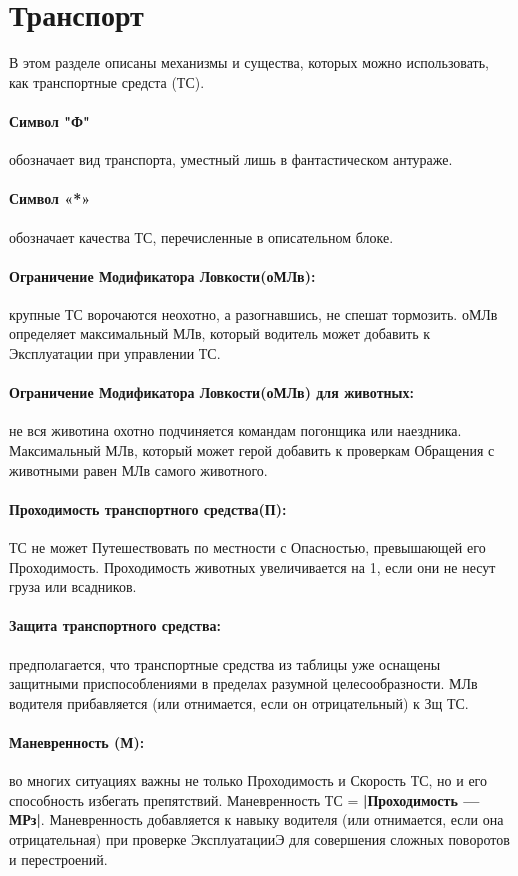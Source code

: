 \section{Транспорт}
В этом разделе описаны механизмы и существа, которых можно использовать, как транспортные средста (ТС).
\paragraph{Символ "Ф"} обозначает вид транспорта, уместный лишь в фантастическом антураже.
\paragraph{Символ «*»} обозначает качества ТС, перечисленные в описательном блоке.
\paragraph{Ограничение Модификатора Ловкости(оМЛв):} крупные ТС ворочаются неохотно, а разогнавшись, не спешат тормозить. оМЛв определяет максимальный МЛв, который водитель может добавить к Эксплуатации при управлении ТС.
\paragraph{Ограничение Модификатора Ловкости(оМЛв) для животных:} не вся животина охотно подчиняется командам погонщика или наездника. Максимальный МЛв, который может герой добавить к проверкам Обращения с животными равен МЛв самого животного.
\paragraph{Проходимость транспортного средства(П):} ТС не может Путешествовать по местности с Опасностью, превышающей его Проходимость. 
\newline Проходимость животных увеличивается на 1, если они не несут груза или всадников.

\paragraph{Защита транспортного средства:} предполагается, что транспортные средства из таблицы уже оснащены защитными приспособлениями в пределах разумной целесообразности. 
\newline МЛв водителя прибавляется (или отнимается, если он отрицательный) к Зщ ТС.
\paragraph{Маневренность (М):} во многих ситуациях важны не только Проходимость и Скорость ТС, но и его способность избегать препятствий. Маневренность ТС = \textbf{|Проходимость — МРз|}. Маневренность добавляется к навыку водителя (или отнимается, если она отрицательная) при проверке ЭксплуатацииЭ для совершения сложных поворотов и перестроений.
